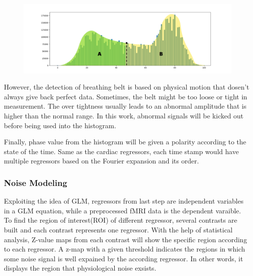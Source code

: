 \begin{figure}[htp]
    \centering
    \includegraphics[width=\columnwidth]{Figures/histogram.png}
    \caption{}
    \label{fig:hist}
\end{figure}

However, the detection of breathing belt is based on physical motion that dosen't always give back
perfect data. Sometimes, the belt might be too loose or tight in measurement. The over tightness usually leads
to an abnormal amplitude that is higher than the normal range. In this work, abnormal signals will be 
kicked out before being used into the histogram.

Finally, phase value from the histogram will be given a polarity according to the state of the time.
Same as the cardiac regressors, each time stamp would have multiple regressors based 
on the Fourier expansion and its order.


\subsubsection{Noise Modeling}

Exploiting the idea of GLM, regressors from last step are independent variables in a GLM 
equation, while a preprocessed fMRI data is the dependent varaible. 
To find the region of interest(ROI) of different regressor, several contrasts are built and
each contrast represents one regressor. With the help of statistical analysis, 
Z-value maps from each contrast will show the specific region according to each regressor.
A z-map with a given threshold indicates the regions in which 
some noise signal is well expained by the according regressor.
In other words, it displays the region that physiological noise exsists. 


